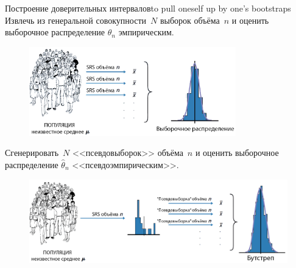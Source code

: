 \documentclass[11pt,pdf,utf8,hyperref={unicode},aspectratio=169]{beamer}
\begin{document}
\begin{frame}[allowframebreaks]{Построение доверительных интервалов}{to pull oneself up by one's bootstraps}
		 Извлечь из генеральной совокупности~$N$ выборок объёма~$n$ и оценить выборочное распределение $\hat{\theta}_n$ эмпирическим.

		\begin{figure}
			\includegraphics[width=0.8\textwidth]{boot2.png}
		\end{figure}

    \framebreak

		 Сгенерировать~$N$ <<псевдовыборок>> объёма~$n$ и оценить выборочное распределение $\hat{\theta}_n$ <<псевдоэмпирическим>>.
		\begin{figure}
			\includegraphics[width=1\textwidth]{boot3.png}
		\end{figure}
\end{frame}
\end{document}

